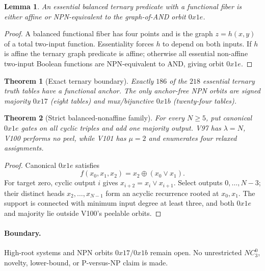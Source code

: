 \documentclass[11pt]{article}
\newtheorem{theorem}{Theorem}
\newtheorem{lemma}{Lemma}
\begin{document}
\begin{lemma}
An essential balanced ternary predicate with a functional fiber is either affine
or NPN-equivalent to the graph-of-AND orbit $0x1e$.
\end{lemma}
\begin{proof}
A balanced functional fiber has four points and is the graph
$z=h(x,y)$ of a total two-input function. Essentiality forces $h$ to depend on
both inputs. If $h$ is affine the ternary graph predicate is affine; otherwise
all essential non-affine two-input Boolean functions are NPN-equivalent to AND,
giving orbit $0x1e$.
\end{proof}

\begin{theorem}[Exact ternary boundary]
Exactly $186$ of the $218$ essential ternary truth tables have a functional
anchor. The only anchor-free NPN orbits are signed majority $0x17$ (eight
tables) and mux/bijunctive $0x1b$ (twenty-four tables).
\end{theorem}

\begin{theorem}[Strict balanced-nonaffine family]
For every $N\ge5$, put canonical $0x1e$ gates on all cyclic triples and add one
majority output. V97 has $\lambda=N$, V100 performs no peel, while V101 has
$\mu=2$ and enumerates four relaxed assignments.
\end{theorem}
\begin{proof}
Canonical $0x1e$ satisfies
\[
f(x_0,x_1,x_2)=x_2\oplus(x_0\lor x_1).
\]
For target zero, cyclic output $i$ gives
$x_{i+2}=x_i\lor x_{i+1}$. Select outputs $0,\ldots,N-3$; their distinct heads
$x_2,\ldots,x_{N-1}$ form an acyclic recurrence rooted at $x_0,x_1$. The support
is connected with minimum input degree at least three, and both $0x1e$ and
majority lie outside V100's peelable orbits.
\end{proof}

\paragraph{Boundary.}
High-root systems and NPN orbits $0x17/0x1b$ remain open. No unrestricted
$NC^0_3$, novelty, lower-bound, or P-versus-NP claim is made.
\end{document}
